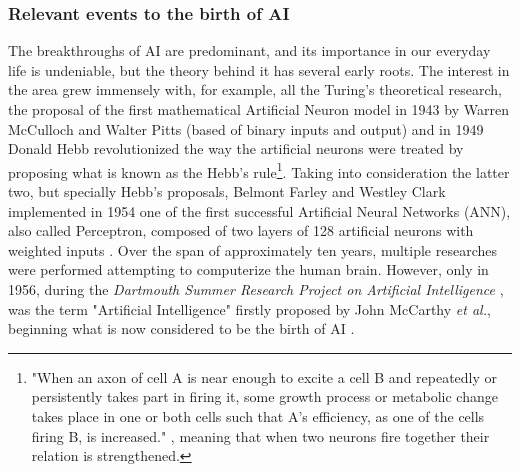 \documentclass[class=report, crop=false, a4paper, 12pt]{standalone}
\begin{document}
\subsubsection{Relevant events to the birth of AI}
\par The breakthroughs of AI are predominant, and its importance in our everyday life is undeniable, but the theory behind it has several early roots. The interest in the area grew immensely with, for example, all the Turing's theoretical research, the proposal of the first mathematical Artificial Neuron model in 1943 by Warren McCulloch and Walter Pitts (based of binary inputs and output) \autocite{mccullochLOGICALCALCULUSIDEAS} and in 1949 Donald Hebb revolutionized the way the artificial neurons were treated by proposing what is known as the Hebb's rule\footnote{"When an axon of cell A is near enough to excite a cell B and repeatedly or persistently takes part in firing it, some growth process or metabolic change takes place in one or both cells such that A’s efficiency, as one of the cells firing B, is increased." \autocite{hebbOrganizationBehaviorNeuropsychological1949}, meaning that when two neurons fire together their relation is strengthened.}. Taking into consideration the latter two, but specially Hebb's proposals, Belmont Farley and Westley Clark implemented in 1954 one of the first successful Artificial Neural Networks (ANN), also called Perceptron, composed of two layers of 128 artificial neurons with weighted inputs \autocite{farleySimulationSelforganizingSystems1954}. Over the span of approximately ten years, multiple researches were performed attempting to computerize the human brain. However, only in 1956, during the \textit{Dartmouth Summer Research Project on Artificial Intelligence} \autocite{mccarthyPROPOSALDARTMOUTHSUMMER}, was the term "Artificial Intelligence" firstly proposed by John McCarthy \textit{et al.}, beginning what is now considered to be the birth of AI \autocite{zhangStudyArtificialIntelligence2021}.  
\end{document}
